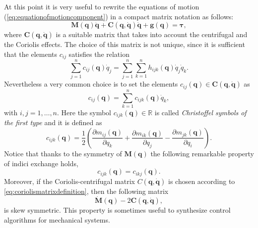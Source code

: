 		At this point it is very useful to rewrite the equations of motion (\ref{eq:equationofmotioncomponent}) in a compact matrix notation as follows:
		\begin{equation}
			\bm{M}(\bm{q})\ddot{\bm{q}} + \bm{C}(\bm{q},\dot{\bm{q}})\dot{\bm{q}} + \bm{g}(\bm{q}) = \bm{\tau},
		\end{equation}
		where $\bm{C}(\bm{q},\dot{\bm{q}})$ is a suitable matrix that takes into account the centrifugal and the Coriolis effects. The choice of this matrix is not unique, since it is sufficient that the elements $c_{ij}$ satisfies the relation
		\begin{equation}
			\sum_{j=1}^{n}c_{ij}(\bm{q})\dot{q}_{j} = \sum_{j=1}^{n}\sum_{k=1}^{n}h_{ijk}(\bm{q})\dot{q}_{j}\dot{q}_{k}.
		\end{equation}
		Nevertheless a very common choice is to set the elements $c_{ij}(\bm{q})\in\bm{C}(\bm{q},\dot{\bm{q}})$ as
		\begin{equation}
			\label{eq:coriolismatrixdefinition}
			c_{ij}(\bm{q}) = \sum_{k=1}^{n}c_{ijk}(\bm{q})\dot{q}_{k},
		\end{equation}
		with $i,j=1,\dots,n$. Here the symbol $c_{ijk}(\bm{q})\in\mathbb{R}$ is called \emph{Christoffel symbols of the first type} and it is defined as
		\begin{equation}
			c_{ijk}(\bm{q}) = \frac{1}{2}\left(\frac{\partial m_{ij}(\bm{q})}{\partial q_{k}}+\frac{\partial m_{ik}(\bm{q})}{\partial q_{j}}-\frac{\partial m_{jk}(\bm{q})}{\partial q_{i}}\right).
		\end{equation}
		Notice that thanks to the symmetry of $\bm{M}(\bm{q})$ the following remarkable property of indici exchange holds,
		\begin{equation}
			c_{ijk}(\bm{q}) = c_{ikj}(\bm{q}).
		\end{equation}
		Moreover, if the Coriolis-centrifugal matrix $C(\bm{q},\dot{\bm{q}})$ is chosen according to \cref{eq:coriolismatrixdefinition}, then the following matrix
		\begin{equation}
			\dot{\bm{M}}(\bm{q})-2\bm{C}(\bm{q},\dot{\bm{q}}),
		\end{equation}
		is skew symmetric. This property is sometimes useful to synthesize control algorithms for mechanical systems.
		
